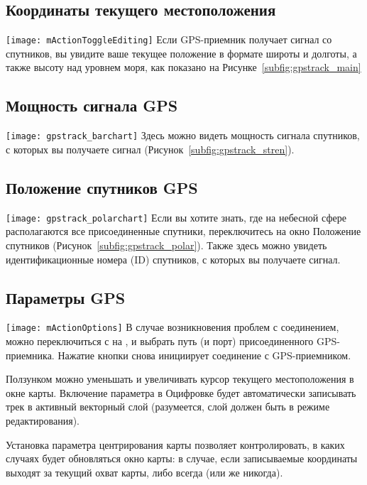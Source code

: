 \subsection{Координаты текущего местоположения}
\texttt{[image: mActionToggleEditing]} Если GPS-приемник
получает сигнал со спутников, вы увидите ваше текущее положение в формате широты
и долготы, а также высоту над уровнем моря, как показано на
Рисунке~\ref{subfig:gpstrack_main}

\subsection{Мощность сигнала GPS}
\texttt{[image: gpstrack\_barchart]} Здесь можно
видеть мощность сигнала спутников, с которых вы получаете сигнал
(Рисунок~\ref{subfig:gpstrack_stren}).

\subsection{Положение спутников GPS}
\texttt{[image: gpstrack\_polarchart]} Если вы
хотите знать, где на небесной сфере располагаются все присоединенные спутники,
переключитесь на окно Положение спутников
(Рисунок~\ref{subfig:gpstrack_polar}). Также здесь можно увидеть
идентификационные номера (ID) спутников, с которых вы получаете сигнал.

\subsection{Параметры GPS}
\texttt{[image: mActionOptions]} В случае
возникновения проблем с соединением, можно переключиться с
 на
, и выбрать путь (и порт)
присоединенного GPS-приемника. Нажатие кнопки 
снова инициирует соединение с GPS-приемником.

Ползунком  можно уменьшать и увеличивать курсор
текущего местоположения в окне карты. Включение параметра
 в Оцифровке будет
автоматически записывать трек в активный векторный слой (разумеется,
слой должен быть в режиме редактирования).

Установка параметра центрирования карты позволяет контролировать, в каких
случаях будет обновляться окно карты: в случае, если записываемые
координаты выходят за текущий охват карты, либо всегда (или же никогда).


